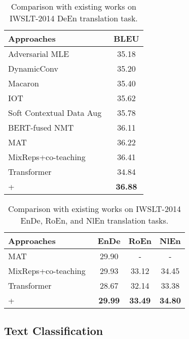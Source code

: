 \documentclass[11pt]{article}
\begin{document}
\begin{table}[!tbp]
    \small
    \centering
{
		\centering
		\begin{tabular}{l c}
		    \hline
		    Approaches & BLEU \\
			\hline
			Adversarial MLE~\cite{DBLP:conf/icml/WangG019} & 35.18 \\
			DynamicConv~\cite{wu2018pay} & 35.20 \\
			Macaron~\cite{lu2019understanding} & 35.40 \\
			IOT~\cite{zhu2021iot} & 35.62 \\
Soft Contextual Data Aug~\cite{DBLP:conf/acl/GaoZWXQCZL19} & 35.78 \\
			BERT-fused NMT~\cite{DBLP:conf/iclr/ZhuXWHQZLL20} & 36.11 \\
			MAT~\cite{DBLP:journals/corr/abs-2006-10270} & 36.22 \\
			MixReps+co-teaching~\cite{wu2020sequence} & 36.41 \\
			\hline
			Transformer & 34.84 \\
			+ & \textbf{36.88} \\
			\hline
           
	\end{tabular} }
	\caption{Comparison with existing works on IWSLT-2014 DeEn translation task.} 
	\label{mt_comparsion}
\end{table}

\begin{table}[!tbp]
    \small
    \centering
	\resizebox{1.0\linewidth}{!}
	{
		\centering
		\begin{tabular}{l| c c c}
		    \hline
		    Approaches & EnDe & RoEn & NlEn \\
			\hline
MAT~\cite{DBLP:journals/corr/abs-2006-10270} & 29.90 & - & -\\
			MixReps+co-teaching~\cite{wu2020sequence} & 29.93 & 33.12 & 34.45\\
			\hline
			Transformer & 28.67 & 32.14 & 33.38\\
			+ & \textbf{29.99} & \textbf{33.49} & \textbf{34.80} \\
			\hline
           
	\end{tabular} }
	\caption{Comparison with existing works on IWSLT-2014 EnDe, RoEn, and NlEn translation tasks.} 
	\label{mt_comparsion_other}
\end{table}


\subsection{Text Classification}
\end{document}
